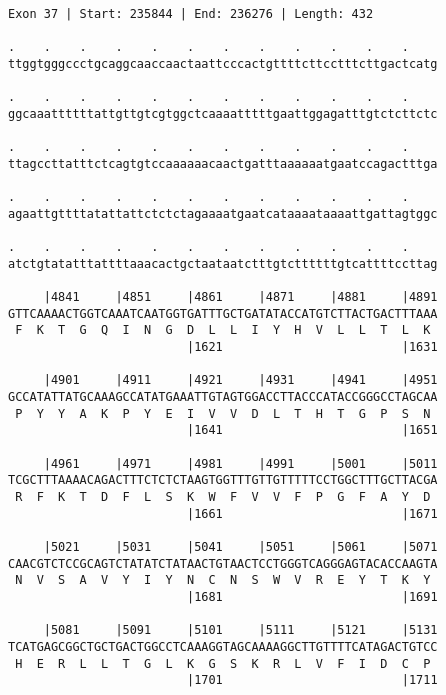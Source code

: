 \documentclass{article}
\begin{document}
\begin{Verbatim}[fontfamily=courier]
Exon 37 | Start: 235844 | End: 236276 | Length: 432

.    .    .    .    .    .    .    .    .    .    .    .    
ttggtgggccctgcaggcaaccaactaattcccactgttttcttcctttcttgactcatg

.    .    .    .    .    .    .    .    .    .    .    .    
ggcaaattttttattgttgtcgtggctcaaaatttttgaattggagatttgtctcttctc

.    .    .    .    .    .    .    .    .    .    .    .    
ttagccttatttctcagtgtccaaaaaacaactgatttaaaaaatgaatccagactttga

.    .    .    .    .    .    .    .    .    .    .    .    
agaattgttttatattattctctctagaaaatgaatcataaaataaaattgattagtggc

.    .    .    .    .    .    .    .    .    .    .    .    
atctgtatatttattttaaacactgctaataatctttgtcttttttgtcattttccttag

     |4841     |4851     |4861     |4871     |4881     |4891
GTTCAAAACTGGTCAAATCAATGGTGATTTGCTGATATACCATGTCTTACTGACTTTAAA
 F  K  T  G  Q  I  N  G  D  L  L  I  Y  H  V  L  L  T  L  K 
                         |1621                         |1631

     |4901     |4911     |4921     |4931     |4941     |4951
GCCATATTATGCAAAGCCATATGAAATTGTAGTGGACCTTACCCATACCGGGCCTAGCAA
 P  Y  Y  A  K  P  Y  E  I  V  V  D  L  T  H  T  G  P  S  N 
                         |1641                         |1651

     |4961     |4971     |4981     |4991     |5001     |5011
TCGCTTTAAAACAGACTTTCTCTCTAAGTGGTTTGTTGTTTTTCCTGGCTTTGCTTACGA
 R  F  K  T  D  F  L  S  K  W  F  V  V  F  P  G  F  A  Y  D 
                         |1661                         |1671

     |5021     |5031     |5041     |5051     |5061     |5071
CAACGTCTCCGCAGTCTATATCTATAACTGTAACTCCTGGGTCAGGGAGTACACCAAGTA
 N  V  S  A  V  Y  I  Y  N  C  N  S  W  V  R  E  Y  T  K  Y 
                         |1681                         |1691

     |5081     |5091     |5101     |5111     |5121     |5131
TCATGAGCGGCTGCTGACTGGCCTCAAAGGTAGCAAAAGGCTTGTTTTCATAGACTGTCC
 H  E  R  L  L  T  G  L  K  G  S  K  R  L  V  F  I  D  C  P 
                         |1701                         |1711

\end{Verbatim}
\newpage
\end{document}
